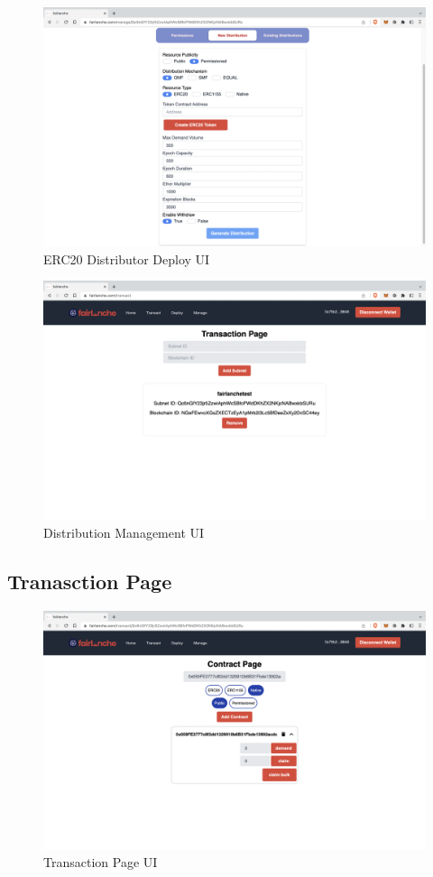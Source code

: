 \documentclass[a4paper,12pt]{report}
\begin{document}
\begin{figure}[H]
	\centering
	\includegraphics[width=1\textwidth]{ss7.png}
	\caption{ERC20 Distributor Deploy UI}
\end{figure}
\begin{figure}[H]
	\centering
	\includegraphics[width=1\textwidth]{ss8.png}
	\caption{Distribution Management UI}
\end{figure}
\subsection{Tranasction Page}
\begin{figure}[H]
	\centering
	\includegraphics[width=1\textwidth]{ss9.png}
	\caption{Transaction Page UI}
\end{figure}
\end{document}
